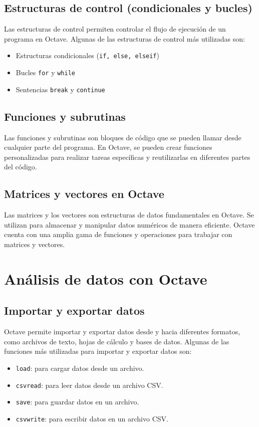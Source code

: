 \documentclass{article}
\begin{document}
\subsection{Estructuras de control (condicionales y bucles)}
Las estructuras de control permiten controlar el flujo de ejecución de un programa en Octave. Algunas de las estructuras de control más utilizadas son:

\begin{itemize}
    \item Estructuras condicionales (\texttt{if, else, elseif})
    \item Bucles \texttt{for} y \texttt{while}
    \item Sentencias \texttt{break} y \texttt{continue}
\end{itemize}

\subsection{Funciones y subrutinas}
Las funciones y subrutinas son bloques de código que se pueden llamar desde cualquier parte del programa. En Octave, se pueden crear funciones personalizadas para realizar tareas específicas y reutilizarlas en diferentes partes del código.

\subsection{Matrices y vectores en Octave}
Las matrices y los vectores son estructuras de datos fundamentales en Octave. Se utilizan para almacenar y manipular datos numéricos de manera eficiente. Octave cuenta con una amplia gama de funciones y operaciones para trabajar con matrices y vectores.

\section{Análisis de datos con Octave}

\subsection{Importar y exportar datos}
Octave permite importar y exportar datos desde y hacia diferentes formatos, como archivos de texto, hojas de cálculo y bases de datos. Algunas de las funciones más utilizadas para importar y exportar datos son:

\begin{itemize}
    \item \texttt{load}: para cargar datos desde un archivo.
    \item \texttt{csvread}: para leer datos desde un archivo CSV.
    \item \texttt{save}: para guardar datos en un archivo.
    \item \texttt{csvwrite}: para escribir datos en un archivo CSV.
\end{itemize}
\end{document}
